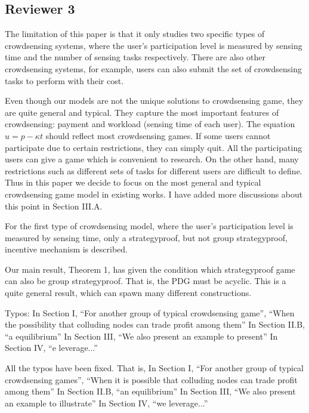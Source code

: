 \documentclass[a4paper,11pt]{exam}
\begin{document}
\begin{questions}
\section{Reviewer 3}
\question The limitation of this paper is that it only studies two specific types of crowdsensing systems, where the user's participation level is measured by sensing time and the number of sensing tasks respectively. There are also other crowdsensing systems, for example, users can also submit the set of crowdsensing tasks to perform with their cost.
\begin{solution}
Even though our models are not the unique solutions to crowdsensing game, they are quite general and typical. They capture the most important features of crowdsensing: payment and workload (sensing time of each user). The equation $u = p - \kappa t$ should reflect most crowdsensing games. If some users cannot participate due to certain restrictions, they can simply quit. All the participating users can give a game which is convenient to research. On the other hand, many restrictions such as different sets of tasks for different users are difficult to define. Thus in this paper we decide to focus on the most general and typical crowdsensing game model in existing works. 
I have added more discussions about this point in Section III.A.
\end{solution}

\question For the first type of crowdsensing model, where the user's participation level is measured by sensing time, only a strategyproof, but not group strategyproof, incentive mechanism is described.
\begin{solution}
Our main result, Theorem 1, has given the condition which strategyproof game can also be group strategyproof. That is, the PDG must be acyclic. This is a quite general result, which can spawn many different constructions.
\end{solution}

\question Typos: 
In Section I, ``For another group of typical crowdsensing game'', ``When the possibility that colluding nodes can trade profit among them''
In Section II.B, ``a equilibrium''
In Section III, ``We also present an example to present''
In Section IV, ``e leverage...''
\begin{solution}
All the typos have been fixed. That is, 
In Section I, ``For another group of typical crowdsensing games'', ``When it is possible that colluding nodes can trade profit among them''
In Section II.B, ``an equilibrium''
In Section III, ``We also present an example to illustrate''
In Section IV, ``we leverage...''
\end{solution}


\end{questions}
\end{document}
